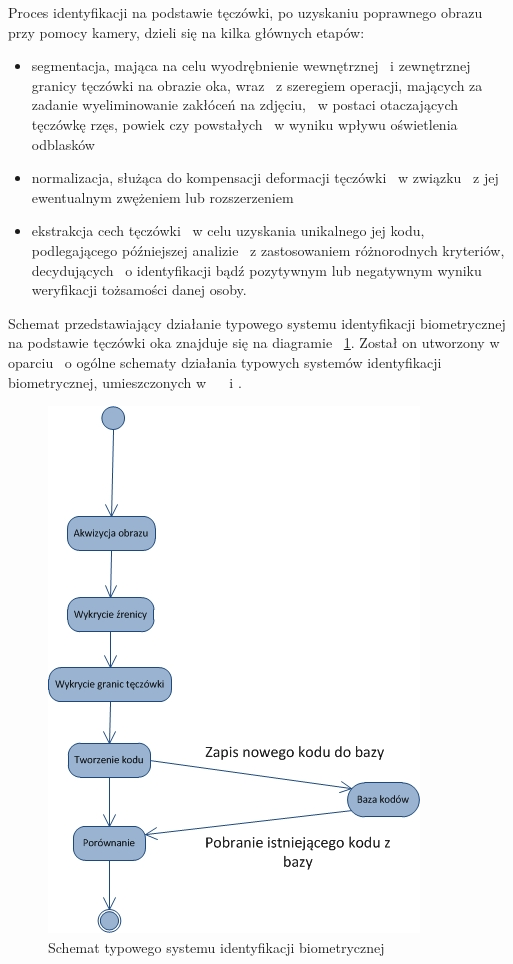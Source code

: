 Proces identyfikacji na podstawie tęczówki, po uzyskaniu poprawnego obrazu przy pomocy kamery, dzieli się na kilka głównych etapów: \begin{itemize}
\item segmentacja, mająca na celu wyodrębnienie wewnętrznej ~i zewnętrznej granicy tęczówki na obrazie oka, wraz ~z szeregiem operacji, mających za zadanie wyeliminowanie zakłóceń na zdjęciu, ~w postaci otaczających tęczówkę rzęs, powiek czy powstałych ~w wyniku wpływu oświetlenia odblasków
\item normalizacja, służąca do kompensacji deformacji tęczówki ~w związku ~z jej ewentualnym zwężeniem lub rozszerzeniem 
\item ekstrakcja cech tęczówki ~w celu uzyskania unikalnego jej kodu, podlegającego późniejszej analizie ~z zastosowaniem różnorodnych kryteriów, decydujących ~o identyfikacji bądź pozytywnym lub negatywnym wyniku weryfikacji tożsamości danej osoby.
\end{itemize}

Schemat przedstawiający działanie typowego systemu identyfikacji biometrycznej na podstawie tęczówki oka znajduje się na diagramie ~\ref{fig:identyfikacja}. Został on utworzony w oparciu ~o ogólne schematy działania typowych systemów identyfikacji biometrycznej, umieszczonych w ~\cite{Bio02} ~i \cite{Jain00}.
\begin{center}
\begin{figure}
\label{fig:identyfikacja}
\includegraphics{schemat.jpg}
\caption{Schemat typowego systemu identyfikacji biometrycznej}
\end{figure}
\end{center}

